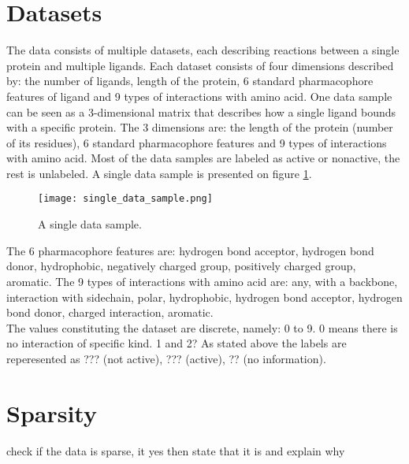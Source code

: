 \documentclass[a4paper,10pt]{report}
\begin{document}
    \section{Datasets}
    The data consists of multiple datasets, each describing reactions between a single protein and multiple ligands. Each dataset consists of four dimensions described by: the number of ligands, length of the protein, 6 standard pharmacophore features of ligand and 9 types of interactions with amino acid\cite{2DSIFT}. One data sample can be seen as a 3-dimensional matrix that describes how a single ligand bounds with a specific protein. The 3 dimensions are: the length of the protein (number of its residues), 6 standard pharmacophore features and 9 types of interactions with amino acid. Most of the data samples are labeled as active or nonactive, the rest is unlabeled. A single data sample is presented on figure \ref{fig:single_data_sample}.\\
    
    \begin{figure}[h!]
      \centering
      \texttt{[image: single\_data\_sample.png]}
      \caption{A single data sample.}
      \label{fig:single_data_sample}
    \end{figure} 
    
    The 6 pharmacophore features are: hydrogen bond acceptor, hydrogen bond donor, hydrophobic, negatively charged group, positively charged group, aromatic. The 9 types of interactions with amino acid are: any, with a backbone, interaction with sidechain, polar, hydrophobic, hydrogen bond acceptor, hydrogen bond donor, charged interaction, aromatic. \\
    
    The values constituting the dataset are discrete, namely: 0 to 9. 0 means there is no interaction of specific kind. 1 and 2? As stated above the labels are reperesented as ??? (not active), ??? (active), ?? (no information).\\
    
    
    \section{Sparsity} %
    check if the data is sparse, it yes then state that it is and explain why\\
    
\end{document}
